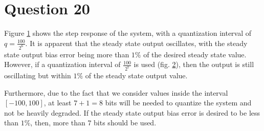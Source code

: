 \section{Question 20}

Figure \ref{fig:20.6b} shows the step response of the system, with a quantization
interval of $q=\frac{100}{2^6}$. It is apparent that the steady state output
oscillates, with the steady state output bias error being more than $1\%$ of
the desired steady state value. However, if a quantization interval of
$\frac{100}{2^7}$ is used (fig. \ref{fig:20.7b}), then the output is still
oscillating but within $1\%$ of the steady state output value.

Furthermore, due to the fact that we consider values inside the interval
$[-100, 100]$, at least $7+1 = 8$ bits will be needed to quantize the system and
not be heavily degraded. If the steady state output bias error is desired to be
less than $1\%$, then, more than $7$ bits should be used.

\begin{figure}[H]\centering
	\centering
	\scalebox{0.8}{}
  \caption{}
  \label{fig:20.6b}
\end{figure}

\begin{figure}[H]\centering
	\centering
	\scalebox{0.8}{}
  \caption{}
  \label{fig:20.7b}
\end{figure}
